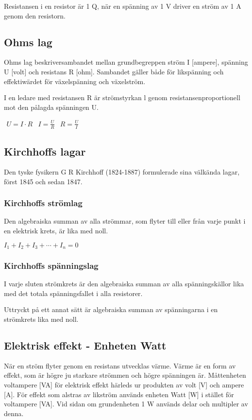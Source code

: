 Resistansen i en resistor är 1 Q, när en
spänning av 1 V driver en ström av 1 A
genom den resistorn.

\subsection{Ohms lag}
Ohms lag beskriversambandet mellan grundbegreppen ström I [ampere], spänning U
[volt] och resistans R [ohm].
Sambandet gäller både för likspänning och effektiwärdet för växelspänning och
växelström.

I en ledare med resistansen R är strömstyrkan l genom resistansenproportionell
mot den pålagda spänningen U.

$\begin{array}{ccc}U=I \cdot R & I=\frac{U}{R} & R=\frac{U}{I}\end{array}$

\subsection{Kirchhoffs lagar}

Den tyske fysikern G R Kirchhoff (1824-1887) formulerade sina välkända lagar, först
1845 och sedan 1847.

\subsubsection{Kirchhoffs strömlag}

Den algebraiska summan av alla strömmar, som flyter till eller från varje punkt i
en elektrisk krets, är lika med noll.

$I_1 + I_2 + I_3 + \cdots + I_n = 0$

\subsubsection{Kirchhoffs spänningslag}

I varje sluten strömkrets är den algebraiska summan av alla spänningskällor lika
med det totala spänningsfallet i alla resistorer.

Uttryckt på ett annat sätt är algebraiska summan av spänningarna i en strömkrets lika med
noll.

\subsection{Elektrisk effekt - Enheten Watt}

När en ström flyter genom en resistans utvecklas värme. Värme är en form av effekt,
som är högre ju starkare strömmen och högre spänningen är.
Måttenheten voltampere [VA] för elektrisk effekt härleds ur produkten av volt [V]
och ampere [A].
För effekt som alstras av likström används enheten Watt [W] i stället för voltampere [VA]. Vid sidan om grundenheten 1 W används delar och multipler av denna.

